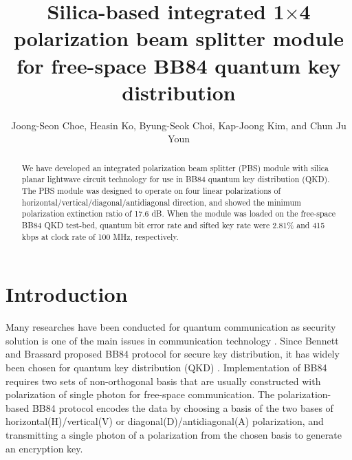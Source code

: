 \documentclass[letterpaper, 10pt]{article}
\begin{document}
\title{Silica-based integrated 1$\times$4 polarization beam splitter module for free-space BB84 quantum key distribution}
\author{Joong-Seon Choe, Heasin Ko, Byung-Seok Choi, Kap-Joong Kim, and Chun Ju Youn}
\address{Electronics and Telecommunications Research Institute, Daejeon 34129, Korea}

\begin{abstract}
We have developed an integrated polarization beam splitter (PBS) module with silica planar lightwave circuit technology for use in BB84 quantum key distribution (QKD).
The PBS module was designed to operate on four linear polarizations of horizontal/vertical/diagonal/antidiagonal direction, and showed the minimum polarization extinction ratio of 17.6 dB.
When the module was loaded on the free-space BB84 QKD test-bed, quantum bit error rate and sifted key rate  were 2.81\% and 415 kbps at clock rate of 100 MHz, respectively.
\end{abstract}






\section{Introduction}

Many researches have been conducted for quantum communication as security solution is one of the main issues in communication technology \cite{Bennett:1984is, Ekert:1991kl,Ko:2017cs}.
Since Bennett and Brassard proposed BB84 protocol for secure key distribution, it has widely been chosen for quantum key distribution (QKD) \cite{Bennett:1984is}.
Implementation of BB84 requires two sets of non-orthogonal basis
that are usually constructed with polarization of single photon for free-space communication.
The polarization-based BB84 protocol encodes the data by choosing a basis of the two bases of horizontal(H)/vertical(V) or diagonal(D)/antidiagonal(A) polarization, and transmitting a single photon of a polarization from the chosen basis to generate an encryption key.
\end{document}
